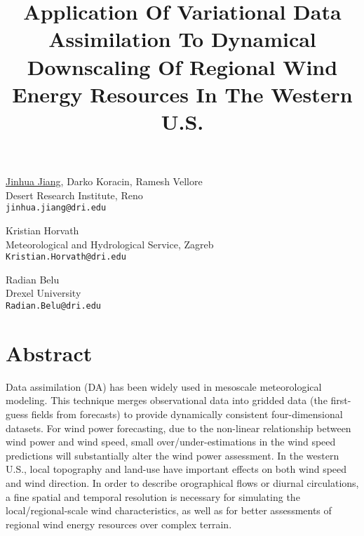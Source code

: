 \title{Application Of Variational Data Assimilation To Dynamical Downscaling Of Regional Wind Energy Resources In The Western U.S.}
\author{} \institute{}
\maketitle

\begin{center}
{\large \underline{Jinhua Jiang}, Darko Koracin, Ramesh Vellore}\\
Desert Research Institute, Reno\\
{\tt jinhua.jiang@dri.edu}\\
\vspace{4mm}

{\large Kristian Horvath}\\
Meteorological and Hydrological Service, Zagreb\\
{\tt Kristian.Horvath@dri.edu}
\vspace{4mm}

{\large Radian Belu}\\
Drexel University\\
{\tt Radian.Belu@dri.edu}
\end{center}

\section*{Abstract}
Data assimilation (DA) has been widely used in mesoscale meteorological modeling. This technique merges observational data into gridded data (the first-guess fields from forecasts) to provide dynamically consistent four-dimensional datasets. For wind power forecasting, due to the non-linear relationship between wind power and wind speed, small over/under-estimations in the wind speed predictions will substantially alter the wind power assessment. In the western U.S., local topography and land-use have important effects on both wind speed and wind direction. In order to describe orographical flows or diurnal circulations, a fine spatial and temporal resolution is necessary for simulating the local/regional-scale wind characteristics, as well as for better assessments of regional wind energy resources over complex terrain. 

